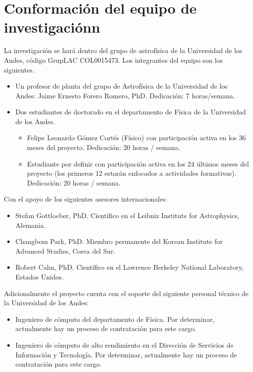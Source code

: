 \section{Conformaci\'on del equipo de investigaci\'onn}

La investigaci\'on se har\'a dentro del grupo de astrof\'isica de la
Universidad de los Andes, c\'odigo GrupLAC COL0015473. Los integrantes
del equipo son los siguientes. 


\begin{itemize}
\item Un profesor de planta del grupo de Astrof\'isica de la
  Universidad de los Andes: Jaime Ernesto  Forero Romero, PhD.
  Dedicaci\'on: 7 horas/semana.
\item Dos estudiantes de doctorado en el departamento de F\'isica de
  la Universidad de los Andes.
\begin{itemize}
\item Felipe Leonardo G\'omez Cort\'es
  (F\'isico) con participaci\'on activa en los 36 meses del proyecto. Dedicaci\'on: 20 horas / semana.  
  \item Estudiante por definir con participaci\'on activa en los 24 \'ultimos
    meses del proyecto (los primeros 12 estar\'an enfocados a
    actividades formativas).  Dedicaci\'on: 20 horas / semana.  
\end{itemize}
\end{itemize}

\noindent
Con el apoyo de los siguientes asesores internacionales:

\begin{itemize}

\item Stefan Gottloeber, PhD. Cient\'ifico en el Leibniz Institute for
  Astrophysics, Alemania.  
\item Changbom Park, PhD. Miembro permanente del Korean Institute for
  Advanced Studies, Corea del Sur. 
\item Robert Cahn, PhD. Cient\'ifico en el Lawrence Berkeley National
  Laboratory, Estados   Unidos. 
\end{itemize}

\noindent
Adicionalmente el proyecto cuenta con el soporte del siguiente
personal t\'ecnico de la Universidad de los Andes:

\begin{itemize}
\item{Ingeniero de c\'omputo del departamento de F\'isica. Por determinar, actualmente hay un proceso de contratación para este cargo.}
\item{Ingeniero de c\'omputo de alto rendimiento en el Direcci\'on de
  Servicios de Informaci\'on y Tecnolog\'ia. Por determinar, actualmente hay un proceso de contratación para este cargo.}
\end{itemize}
